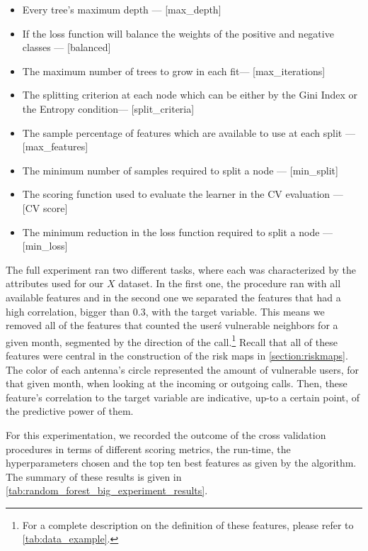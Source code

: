 \begin{itemize}\label{list:random_forest_grid_search_params}

  \item Every tree's maximum depth --- [max\_depth]
  \item If the loss function will balance the weights of the positive and negative classes --- [balanced]
  \item The maximum number of trees to grow in each fit--- [max\_iterations]
  \item The splitting criterion at each node which can be either by the Gini Index or the Entropy condition--- [split\_criteria]
  \item The sample percentage of features which are available to use at each split --- [max\_features]
  \item The minimum number of samples required to split a node --- [min\_split]
  \item The scoring function used to evaluate the learner in the CV evaluation --- [CV score]
  \item The minimum reduction in the loss function required to split a node  --- [min\_loss]
\end{itemize}


The full experiment ran two different tasks, where each was characterized by the attributes used for our $X$ dataset.
In the first one, the procedure ran with all available features and in the second one we separated the features that had a high correlation, bigger than $0.3$, with the target variable.
This means we removed all of the features that counted the user\'s vulnerable neighbors for a given month, segmented by the direction of the call.\footnote{For a complete description on the definition of these features, please refer to \cref{tab:data_example}.}
Recall that all of these features were central in the construction of the risk maps in \cref{section:riskmaps}.
The color of each antenna's circle represented the amount of vulnerable users, for that given month, when looking at the incoming or outgoing calls.
Then, these feature's correlation to the target variable are indicative, up-to a certain point, of the predictive power of them.

For this experimentation, we recorded the outcome of the cross validation procedures in terms of different scoring metrics, the run-time, the hyperparameters chosen and the top ten best features as given by the algorithm.
The summary of these results is given in \cref{tab:random_forest_big_experiment_results}.

